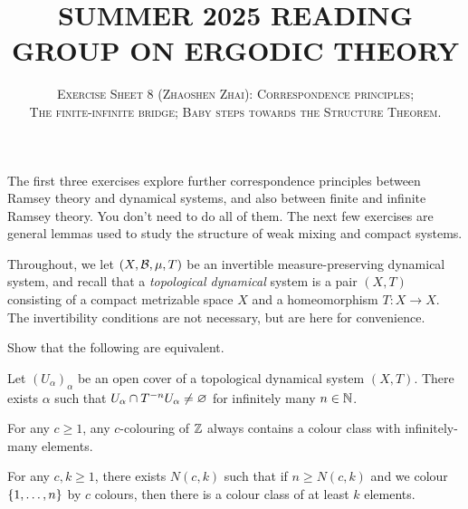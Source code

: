 \documentclass[reqno, twoside]{article}
\begin{document}
    \title{\textbf{\normalsize\MakeUppercase{Summer 2025 Reading Group on Ergodic Theory}}}
    \author{\normalsize\textsc{Exercise Sheet 8 (Zhaoshen Zhai): Correspondence principles;}\\\normalsize\textsc{The finite-infinite bridge; Baby steps towards the Structure Theorem.}}
    \date{}
    \maketitle

    The first three exercises explore further correspondence principles between Ramsey theory and dynamical systems, and also between finite and infinite Ramsey theory. You don't need to do all of them. The next few exercises are general lemmas used to study the structure of weak mixing and compact systems.

    Throughout, we let $(X,\mathcal{B},\mu,T)$ be an invertible measure-preserving dynamical system, and recall that a \textit{topological dynamical} system is a pair $(X,T)$ consisting of a compact metrizable space $X$ and a homeomorphism $T:X\to X$. The invertibility conditions are not necessary, but are here for convenience.

    \begin{exercise}
        Show that the following are equivalent.
        \begin{center}
            \begin{minipage}{0.95\textwidth}
                \begin{theorem*}
                    Let $(U_\alpha)_\alpha$ be an open cover of a topological dynamical system $(X,T)$. There exists $\alpha$ such that $U_\alpha\cap T^{-n}U_\alpha\neq\varnothing$ for infinitely many $n\in\mathbb{N}$.
                \end{theorem*}
                \begin{theorem*}
                    For any $c\geq1$, any $c$-colouring of $\mathbb{Z}$ always contains a colour class with infinitely-many elements.
                \end{theorem*}
                \begin{theorem*}
                    For any $c,k\geq1$, there exists $N(c,k)$ such that if $n\geq N(c,k)$ and we colour $\left\{1,\dots,n\right\}$ by $c$ colours, then there is a colour class of at least $k$ elements.
                \end{theorem*}
            \end{minipage}
        \end{center}
    \end{exercise}
\end{document}
